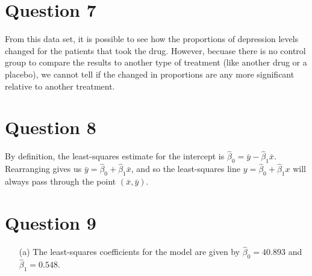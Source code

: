 \documentclass[10pt]{article}
\begin{document}
\section{Question 7} \noindent
From this data set, it is possible to see how the proportions of depression levels changed for the patients that took the drug. However, becuase there is no 
control group to compare the results to another type of treatment (like another drug or a placebo), we cannot tell if the changed in proportions are any 
more significant relative to another treatment. 

\section{Question 8} \noindent
By definition, the least-squares estimate for the intercept is \(\hat{\beta}_0 = \bar{y} - \hat{\beta}_1 \bar{x}\).
Rearranging gives us \(\bar{y} = \hat{\beta}_0 + \hat{\beta}_1 \bar{x}\), and so the least-squares line \(y = \hat{\beta}_0 + \hat{\beta}_1 x\) will always 
pass through the point \((\bar{x}, \bar{y})\).

\section{Question 9} \noindent
\begin{itemize}
    \item[(a)] The least-squares coefficients for the model are given by \(\hat{\beta}_0 = 40.893\) and \(\hat{\beta}_1 = 0.548\).
\end{itemize}

\end{document}
